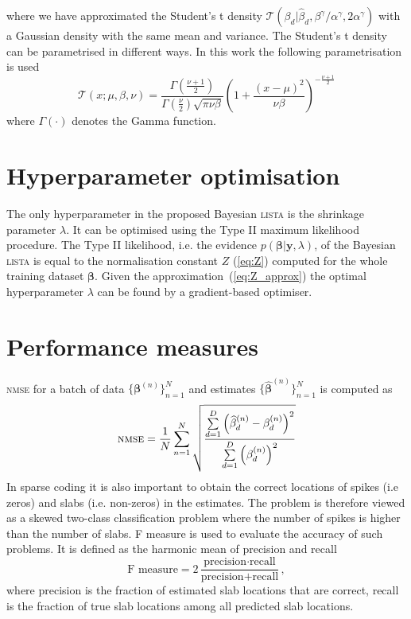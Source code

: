 \documentclass{article}
\begin{document}
where we have approximated the Student's t density $\mathcal{T}\left(\beta_d | \widehat{\beta}_d, \beta^\gamma / \alpha^\gamma, 2\alpha^\gamma\right)$ with a Gaussian density with the same mean and variance. The Student's t density can be parametrised in different ways. In this work the following parametrisation is used
\begin{equation}
\mathcal{T}(x; \mu, \beta, \nu) = \frac{\Gamma\left(\frac{\nu + 1}{2}\right)}{\Gamma\left(\frac{\nu}{2}\right)\sqrt{\pi \nu \beta}} \left(1 + \frac{(x - \mu)^2}{\nu\beta}\right)^{-\frac{\nu + 1}{2}}
\end{equation}
where $\Gamma(\cdot)$ denotes the Gamma function.

\section{Hyperparameter optimisation}
The only hyperparameter in the proposed Bayesian \textsc{lista} is the shrinkage parameter $\lambda$. It can be optimised using the Type II maximum likelihood procedure. The Type II likelihood, i.e. the evidence $p(\boldsymbol\beta | \mathbf{y}, \lambda)$, of the Bayesian \textsc{lista} is equal to the normalisation constant $Z$ (\ref{eq:Z}) computed for the whole training dataset $\boldsymbol\beta$. Given the approximation~(\ref{eq:Z_approx}) the optimal hyperparameter $\lambda$ can be found by a gradient-based optimiser.

\section{Performance measures}
\textsc{nmse} for a batch of data $\{\boldsymbol\beta^{(n)}\}_{n=1}^{N}$ and estimates $\{\widehat{\boldsymbol\beta}^{(n)}\}_{n=1}^{N}$ is computed as
\begin{equation}
\text{\textsc{nmse}} = \frac{1}{N}\sum\limits_{n=1}^N\sqrt{\frac{\sum\limits_{d=1}^D\left(\widehat{\beta}_{d}^{(n)} - \beta_d^{(n)}\right)^2}{\sum\limits_{d=1}^D\left(\beta_{d}^{(n)}\right)^2}}
\end{equation}
In sparse coding it is also important to obtain the correct locations of spikes (i.e zeros) and slabs (i.e. non-zeros) in the estimates. The problem is therefore viewed as a skewed two-class classification problem where the number of spikes is higher than the number of slabs. F measure is used to evaluate the accuracy of such problems. It is defined as the harmonic mean of precision and recall
\begin{equation}
\text{F measure} = 2\dfrac{\text{precision}\cdot\text{recall}}{\text{precision} + \text{recall}},
\end{equation}
where precision is the fraction of estimated slab locations that are correct, recall is the fraction of true slab locations among all predicted slab locations.
\end{document}
